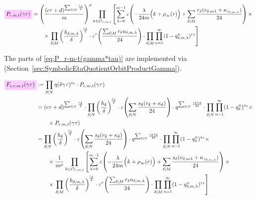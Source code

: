 \documentclass{article}
\begin{document}
\begin{align}
  \defineNotation[P-r-m-t-gamma-tau]{P_{r,m,t}(\gamma\tau)}
  &=
    \left(\frac{(c\tau+d)^{\divisorsum{M} \frac{r_\delta}{2}}}{m}\right)^\mu
    \prod_{k\in \modularOrbit{r,m,t}}
    \left[\sum_{\lambda=0}^{m-1}
    \unityPower{-\frac{\lambda}{24m}\Bigl(k+\rho_\infty(r)\Bigr)
    + \divisorsum{M}\frac{r_\delta(v_{\delta,m\lambda} +
    \kappa_{\gamma_{\delta,m,\lambda}})}{24}} \times\right.\notag\\
  &\qquad\times
    \left.
    \divisorprod{M}
    \left(\frac{h_{\delta,m,\lambda}}{\delta}\right)^{\!\frac{r_\delta}{2}}
    \cdot
    \unityPowerTau{\frac{\divisorsum{M} r_\delta u_{\delta,m,\lambda}}{24}}
    \cdot
    \divisorprod{M} \prod_{n=1}^\infty (1-q_{\delta,m,\lambda}^n)^{r_\delta}
    \right]
    \label{eq:P_r-m-t(gamma*tau)}
\end{align}

The parts of \eqref{eq:P_r-m-t(gamma*tau)} are implemented via
\textcolor{blue}{}
(Section~\ref{sec:SymbolicEtaQuotientOrbitProductGamma}).


\begin{align}
  \defineNotation[F-s-r-m-t-gamma-tau]{F_{s,r,m,t}(\gamma\tau)}
  &:= \divisorprod{N} \eta(\delta\gamma\tau)^{s_\delta}
    \cdot
    P_{r, m, t}(\gamma\tau)
  \notag\\
  &=
  (c\tau+d)^{\divisorsum{N} \frac{s_\delta}{2}}
  \cdot
  \divisorprod{N}
  \left(\frac{h_\delta}{\delta}\right)^{\!\frac{s_\delta}{2}}
  \cdot
  \unityPower{\divisorsum{N} \frac{s_\delta(v_\delta + \kappa_\delta)}{24}}
  \cdot
  q^{\divisorsum{N} \frac{s_\delta u_\delta}{24}}
  \cdot
    \divisorprod{N} \prod_{n=1}^{\infty}(1-q_\delta^n)^{s_\delta} \times\notag\\
  &\qquad\times
    P_{r, m, t}(\gamma\tau)
  \notag\\
  &=
  \divisorprod{N}
  \left(\frac{h_\delta}{\delta}\right)^{\!\frac{s_\delta}{2}}
  \cdot
  \unityPower{\divisorsum{N} \frac{s_\delta(v_\delta + \kappa_\delta)}{24}}
  \cdot
  q^{\divisorsum{N} \frac{s_\delta u_\delta}{24}}
    \cdot
    \divisorprod{N} \prod_{n=1}^{\infty}(1-q_\delta^n)^{s_\delta} \times\notag\\
  &\qquad\times
    \frac{1}{m^\mu}
    \prod_{k\in \modularOrbit{r,m,t}}
    \left[\sum_{\lambda=0}^{m-1}
    \unityPower{-\frac{\lambda}{24m}\Bigl(k+\rho_\infty(r)\Bigr)
    + \divisorsum{M}\frac{s_\delta(v_{\delta,m\lambda} +
    \kappa_{\gamma_{\delta,m,\lambda}})}{24}} \times\right.\notag\\
  &\qquad\times
    \left.
    \divisorprod{M}
    \left(\frac{h_{\delta,m,\lambda}}{\delta}\right)^{\!\frac{r_\delta}{2}}
    \cdot
    \unityPowerTau{\frac{\divisorsum{M} r_\delta u_{\delta,m,\lambda}}{24}}
    \cdot
    \divisorprod{M} \prod_{n=1}^\infty (1-q_{\delta,m,\lambda}^n)^{r_\delta}
    \right]
    \label{eq:F_s-r-m-t(gamma*tau)}
\end{align}
\end{document}
